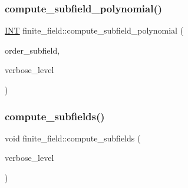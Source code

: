 \mbox{\label{classfinite__field_a59a7fda7cd4dafc8e6da787306ae33b5}} 
\subsubsection{\texorpdfstring{compute\+\_\+subfield\+\_\+polynomial()}{compute\_subfield\_polynomial()}}
{\footnotesize\ttfamily \mbox{\hyperlink{galois_8h_a09fddde158a3a20bd2dcadb609de11dc}{I\+NT}} finite\+\_\+field\+::compute\+\_\+subfield\+\_\+polynomial (\begin{DoxyParamCaption}\item[{\mbox{\hyperlink{galois_8h_a09fddde158a3a20bd2dcadb609de11dc}{I\+NT}}}]{order\+\_\+subfield,  }\item[{\mbox{\hyperlink{galois_8h_a09fddde158a3a20bd2dcadb609de11dc}{I\+NT}}}]{verbose\+\_\+level }\end{DoxyParamCaption})}

\mbox{\label{classfinite__field_a1632c3686fa5ff446c651e880df9f4e8}} 
\subsubsection{\texorpdfstring{compute\+\_\+subfields()}{compute\_subfields()}}
{\footnotesize\ttfamily void finite\+\_\+field\+::compute\+\_\+subfields (\begin{DoxyParamCaption}\item[{\mbox{\hyperlink{galois_8h_a09fddde158a3a20bd2dcadb609de11dc}{I\+NT}}}]{verbose\+\_\+level }\end{DoxyParamCaption})}

\mbox{\label{classfinite__field_a2bfe6d4feabc4f27d253c7702ef9b8cb}} 
